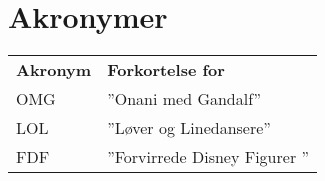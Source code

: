 \section*{Akronymer}
\begin{table}[h!]
    	\begin{tabular}{p{}|p{}}
    	\textbf{Akronym}&\textbf{Forkortelse for}
    	\\  	
    	OMG&''Onani med Gandalf''
    	\\
    	LOL&''Løver og Linedansere''
    	\\
    	FDF&''Forvirrede Disney Figurer ''	
    	\\
    	\end{tabular}
\end{table}

